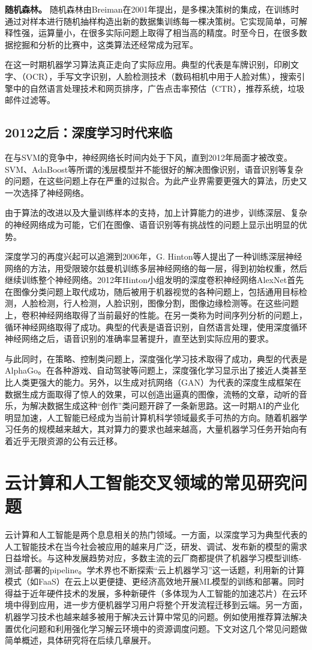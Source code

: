 \textbf{随机森林。}
随机森林由Breiman在2001年提出，是多棵决策树的集成，在训练时通过对样本进行随机抽样构造出新的数据集训练每一棵决策树。它实现简单，可解释性强，运算量小，在很多实际问题上取得了相当高的精度。时至今日，在很多数据挖掘和分析的比赛中，这类算法还经常成为冠军。

在这一时期机器学习算法真正走向了实际应用。典型的代表是车牌识别，印刷文字、（OCR），手写文字识别，人脸检测技术（数码相机中用于人脸对焦），搜索引擎中的自然语言处理技术和网页排序，广告点击率预估（CTR），推荐系统，垃圾邮件过滤等。

\subsection{2012之后：深度学习时代来临}
在与SVM的竞争中，神经网络长时间内处于下风，直到2012年局面才被改变。SVM、AdaBoost等所谓的浅层模型并不能很好的解决图像识别，语音识别等复杂的问题，在这些问题上存在严重的过拟合。为此产业界需要更强大的算法，历史又一次选择了神经网络。

由于算法的改进以及大量训练样本的支持，加上计算能力的进步，训练深层、复杂的神经网络成为可能，它们在图像、语音识别等有挑战性的问题上显示出明显的优势。

深度学习的再度兴起可以追溯到2006年，G. Hinton等人提出了一种训练深层神经网络的方法，用受限玻尔兹曼机训练多层神经网络的每一层，得到初始权重，然后继续训练整个神经网络。2012年Hinton小组发明的深度卷积神经网络AlexNet首先在图像分类问题上取代成功，随后被用于机器视觉的各种问题上，包括通用目标检测，人脸检测，行人检测，人脸识别，图像分割，图像边缘检测等。在这些问题上，卷积神经网络取得了当前最好的性能。在另一类称为时间序列分析的问题上，循环神经网络取得了成功。典型的代表是语音识别，自然语言处理，使用深度循环神经网络之后，语音识别的准确率显著提升，直至达到实际应用的要求。

与此同时，在策略、控制类问题上，深度强化学习技术取得了成功，典型的代表是AlphaGo。在各种游戏、自动驾驶等问题上，深度强化学习显示出了接近人类甚至比人类更强大的能力。另外，以生成对抗网络（GAN）为代表的深度生成框架在数据生成方面取得了惊人的效果，可以创造出逼真的图像，流畅的文章，动听的音乐，为解决数据生成这种“创作”类问题开辟了一条新思路。这一时期AI的产业化明显加速，人工智能已经成为当前计算机科学领域最炙手可热的方向。随着机器学习任务的规模越来越大，其对算力的要求也越来越高，大量机器学习任务开始向有着近乎无限资源的公有云迁移。

\section{云计算和人工智能交叉领域的常见研究问题}
云计算和人工智能是两个息息相关的热门领域。一方面，以深度学习为典型代表的人工智能技术在当今社会被应用的越来月广泛，研发、调试、发布新的模型的需求日益增长。与这种发展趋势对应，多数主流的云厂商都提供了机器学习模型训练-测试-部署的pipeline。学术界也不断探索“云上机器学习”这一话题，利用新的计算模式（如FaaS）在云上以更便捷、更经济高效地开展ML模型的训练和部署。同时得益于近年硬件技术的发展，多种新硬件（多体现为人工智能的加速芯片）在云环境中得到应用，进一步方便机器学习用户将整个开发流程迁移到云端。另一方面，机器学习技术也越来越多被用于解决云计算中常见的问题。例如使用推荐算法解决置优化问题和利用强化学习解云环境中的资源调度问题。下文对这几个常见问题做简单概述，具体研究将在后续几章展开。

